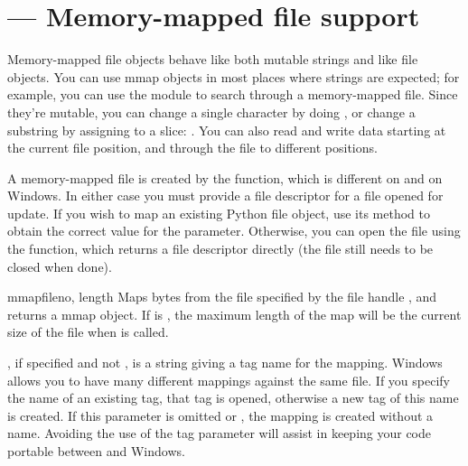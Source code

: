 \section{ ---
	Memory-mapped file support}


Memory-mapped file objects behave like both mutable strings and like
file objects.  You can use mmap objects in most places where strings
are expected; for example, you can use the  module to
search through a memory-mapped file.  Since they're mutable, you can
change a single character by doing , or
change a substring by assigning to a slice:
.  You can also read and write
data starting at the current file position, and 
through the file to different positions.

A memory-mapped file is created by the  function,
which is different on \UNIX{} and on Windows.  In either case you must
provide a file descriptor for a file opened for update.
If you wish to map an existing Python file object, use its
 method to obtain the correct value for the
 parameter.  Otherwise, you can open the file using the
 function, which returns a file descriptor
directly (the file still needs to be closed when done).

\begin{funcdesc}{mmap}{fileno, length}
  Maps  bytes from the file
specified by the file handle , and returns a mmap object.
If  is , the maximum length of the map will be the
current size of the file when  is called.

, if specified and not , is a string giving a
tag name for the mapping.  Windows allows you to have many different
mappings against the same file.  If you specify the name of an
existing tag, that tag is opened, otherwise a new tag of this name is
created.  If this parameter is omitted or , the mapping is
created without a name.  Avoiding the use of the tag parameter will
assist in keeping your code portable between \UNIX{} and Windows.
\end{funcdesc}

